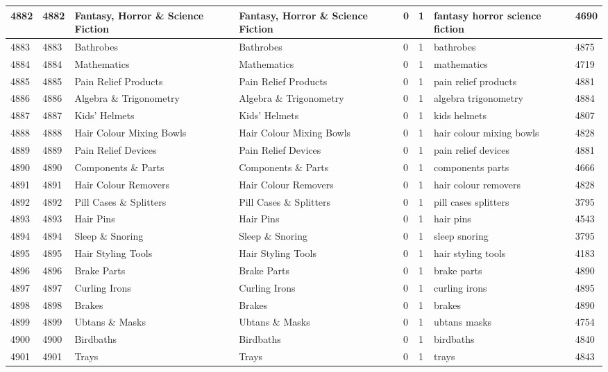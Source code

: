 \begin{longtable}{|l|l|l|l|l|l|l|l|}
4882 & 4882 & Fantasy, Horror \& Science Fiction & Fantasy, Horror \& Science Fiction & 0 & 1 & fantasy horror science fiction & 4690 \\ \hline 
4883 & 4883 & Bathrobes & Bathrobes & 0 & 1 & bathrobes & 4875 \\ \hline 
4884 & 4884 & Mathematics & Mathematics & 0 & 1 & mathematics & 4719 \\ \hline 
4885 & 4885 & Pain Relief Products & Pain Relief Products & 0 & 1 & pain relief products & 4881 \\ \hline 
4886 & 4886 & Algebra \& Trigonometry & Algebra \& Trigonometry & 0 & 1 & algebra trigonometry & 4884 \\ \hline 
4887 & 4887 & Kids' Helmets & Kids' Helmets & 0 & 1 & kids helmets & 4807 \\ \hline 
4888 & 4888 & Hair Colour Mixing Bowls & Hair Colour Mixing Bowls & 0 & 1 & hair colour mixing bowls & 4828 \\ \hline 
4889 & 4889 & Pain Relief Devices & Pain Relief Devices & 0 & 1 & pain relief devices & 4881 \\ \hline 
4890 & 4890 & Components \& Parts & Components \& Parts & 0 & 1 & components parts & 4666 \\ \hline 
4891 & 4891 & Hair Colour Removers & Hair Colour Removers & 0 & 1 & hair colour removers & 4828 \\ \hline 
4892 & 4892 & Pill Cases \& Splitters & Pill Cases \& Splitters & 0 & 1 & pill cases splitters & 3795 \\ \hline 
4893 & 4893 & Hair Pins & Hair Pins & 0 & 1 & hair pins & 4543 \\ \hline 
4894 & 4894 & Sleep \& Snoring & Sleep \& Snoring & 0 & 1 & sleep snoring & 3795 \\ \hline 
4895 & 4895 & Hair Styling Tools & Hair Styling Tools & 0 & 1 & hair styling tools & 4183 \\ \hline 
4896 & 4896 & Brake Parts & Brake Parts & 0 & 1 & brake parts & 4890 \\ \hline 
4897 & 4897 & Curling Irons & Curling Irons & 0 & 1 & curling irons & 4895 \\ \hline 
4898 & 4898 & Brakes & Brakes & 0 & 1 & brakes & 4890 \\ \hline 
4899 & 4899 & Ubtans \& Masks & Ubtans \& Masks & 0 & 1 & ubtans masks & 4754 \\ \hline 
4900 & 4900 & Birdbaths & Birdbaths & 0 & 1 & birdbaths & 4840 \\ \hline 
4901 & 4901 & Trays & Trays & 0 & 1 & trays & 4843 \\ \hline 

\end{longtable}
